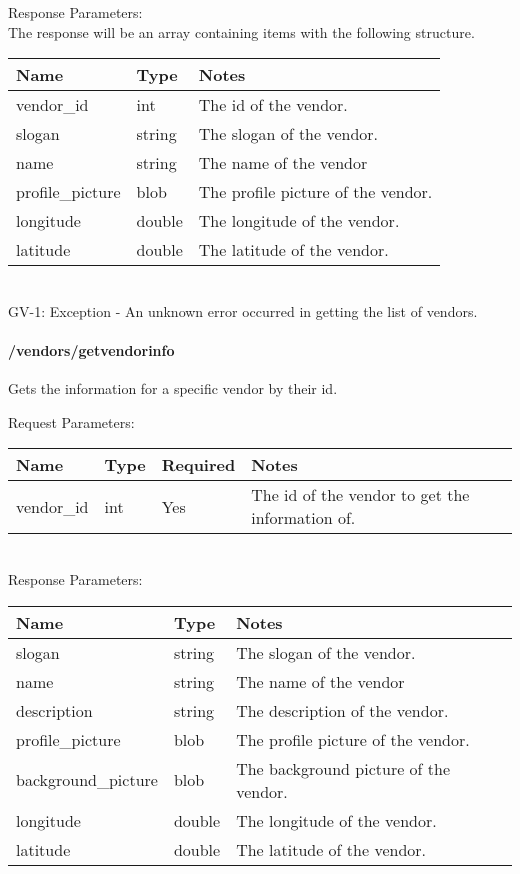 \documentclass{article}[11pt]
\begin{document}
\noindent
Response Parameters: \\

\noindent
The response will be an array containing items with the following structure.

\noindent
\begin{tabular}{|l|l|l|}
\hline
\textbf{Name} & \textbf{Type} & \textbf{Notes} \\
\hline
vendor\_id & int & The id of the vendor. \\
slogan & string & The slogan of the vendor. \\
name & string & The name of the vendor \\
profile\_picture & blob & The profile picture of the vendor. \\
longitude & double & The longitude of the vendor. \\
latitude & double & The latitude of the vendor. \\
\hline
\end{tabular} \\

\ErrorsSession
GV-1: Exception - An unknown error occurred in getting the list of vendors. \\



\paragraph{/vendors/getvendorinfo}\textbf{}

Gets the information for a specific vendor by their id.

\noindent
Request Parameters:

\noindent
\begin{tabular}{|l|l|l|l|}
\hline
\textbf{Name} & \textbf{Type} & \textbf{Required} & \textbf{Notes} \\
\hline
vendor\_id & int & Yes & The id of the vendor to get the information of. \\
\hline
\end{tabular} \\

\noindent
Response Parameters: \\

\noindent
\begin{tabular}{|l|l|l|}
\hline
\textbf{Name} & \textbf{Type} & \textbf{Notes} \\
\hline
slogan & string & The slogan of the vendor. \\
name & string & The name of the vendor \\
description & string & The description of the vendor. \\
profile\_picture & blob & The profile picture of the vendor. \\
background\_picture & blob & The background picture of the vendor. \\
longitude & double & The longitude of the vendor. \\
latitude & double & The latitude of the vendor. \\
\hline
\end{tabular} \\
\end{document}
